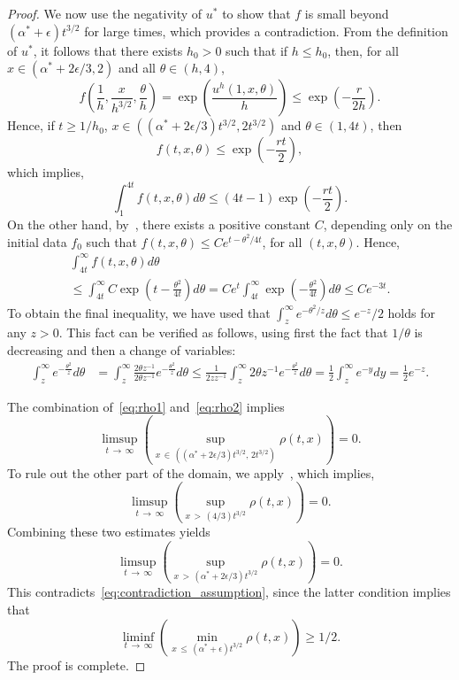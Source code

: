 \documentclass[10pt]{amsart}
\theoremstyle{definition}\newtheorem{defi}[theo]{Definition}\newtheorem{rema}[theo]{Remark}\newtheorem{exam}[theo]{Example}\newtheorem{exem}[theo]{Example}\newtheorem{nota}[theo]{Notation}
\newcommand{\1}{\mathds{1}}
\newcommand{\e}{\epsilon}
\begin{document}
\begin{proof}
We now use the negativity of $u^*$ to show that $f$ is small beyond $(\alpha^* + \e) t^{3/2}$ for large times, which provides a contradiction. From the definition of $u^*$, it follows that there exists $h_0>0$ such that if $h \leq h_0$, then, for all $x \in (\alpha^*+2\e/3,2)$ and all $\theta \in (h,4)$,
\[
f\left (\frac 1h,\frac x{h^{3/2}}, \frac \theta h\right) = \exp\left (\frac{u^h(1,x,\theta)}h\right)\leq \exp\left(-\frac{r}{2h}\right).
\]
Hence, if $t \geq 1/h_0$, $x \in  ((\alpha^* + 2\e/3)t^{3/2}, 2t^{3/2})$ and $\theta \in (1, 4t)$, then
\[
f(t,x, \theta)
\leq \exp\left(-\frac{r t}2\right),
\]
which implies,
\begin{equation}\label{eq:rho1}
\int_1^{4t} f(t,x,\theta) d\theta
\leq (4t-1) \exp\left (-\frac{r t}2\right).
\end{equation}
On the other hand, by~\cite[Equation~(3.5)]{BHR_acceleration}, there exists a positive constant $C$, depending only on the initial data $f_0$ such that $f(t,x,\theta) \leq C e^{t - \theta^2/4t}$, for all $(t,x,\theta)$. Hence,
\begin{multline}\label{eq:rho2}
\int_{4t}^\infty f(t,x,\theta) d\theta\\
\leq \int_{4t}^\infty C \exp\left (t- \frac{\theta^2}{4t}\right)d\theta = C e^t \int_{4t}^\infty \exp\left (- \frac{\theta^2}{4t}\right)d\theta \leq C e^{-3t}.
\end{multline}
To obtain the final inequality, we have used that $\int_z^\infty e^{-\theta^2/z}d\theta \leq e^{-z}/2$ holds for any $z>0$. This fact can be verified as follows, using first the fact that $1/\theta$ is decreasing and then a change of variables:
\begin{align*}
\int_{z}^\infty e^{ - \frac{\theta^2}{z}}d\theta & =\int_{z}^\infty \frac{2\theta z^{-1}}{2\theta z^{-1}} e^{ - \frac{\theta^2}{z}}d\theta
\leq \frac{1}{2z z^{-1}} \int_{z}^\infty 2\theta z^{-1} e^{ - \frac{\theta^2}{z}}d\theta = \frac{1}{2} \int_{z}^\infty e^{-y}dy=\frac{1}{2}e^{-z}.
\end{align*}

The combination of~\eqref{eq:rho1} and~\eqref{eq:rho2} implies
\[
\limsup_{t\,\to\,\infty} \left (\sup_{x\,\in\,\left(\left(\alpha^* + 2\e/3\right)t^{3/2},\,2t^{3/2}\right)} \rho(t,x) \right) = 0.
\]
To rule out the other part of the domain, we apply~\cite[Theorem~1.2]{BHR_acceleration}, which implies,
\[
\limsup_{t\,\to\,\infty} \left (\sup_{x\,>\, (4/3)t^{3/2}} \rho(t,x)\right) = 0.
\]
Combining these two estimates yields
\[
\limsup_{t\,\to\,\infty} \left (\sup_{x\,>\, \left(\alpha^* + 2\e/3\right)t^{3/2}} \rho(t,x) \right) = 0.
\]
This contradicts~\eqref{eq:contradiction_assumption}, since the latter condition implies that
\[
\liminf_{t\,\to\,\infty}\left(\min_{x\,\leq\, \left(\alpha^* + \e\right)t^{3/2}} \rho(t,x) \right) \geq 1/2.
\]
The proof is complete.
\end{proof}
\end{document}
